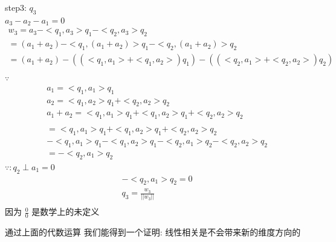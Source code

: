 \documentclass[12pt]{article}
\begin{document}
\begin{flushleft}
    step3: $q_{3}$ \\
    $ a_{3} - a_{2} - a_{1} = 0 $ \\
    \begin{align}
        w_{3} = a_{3} - <q_{1},a_{3}>q_{1} - <q_{2},a_{3}>q_{2}                                             \\
        = (a_{1} + a_{2})  - <q_{1}, (a_{1}+ a_{2})>q_{1} - <q_{2},(a_{1} + a_{2})>q_{2}                    \\
        = (a_{1} + a_{2}) - ((<q_{1},a_{1}> + <q_{1},a_{2}>)q_{1}) - ((<q_{2},a_{1}> + <q_{2},a_{2}>)q_{2}) \\
    \end{align}
    $\because$ \\
    \begin{align}
        a_{1} = <q_{1},a_{1}>q_{1}                                                           \\
        a_{2} = <q_{1},a_{2}>q_{1} + <q_{2},a_{2}>q_{2}                                      \\
        a_{1} + a_{2} =  <q_{1},a_{1}>q_{1} +  <q_{1},a_{2}>q_{1} + <q_{2},a_{2}>q_{2}       \\                                                                                                                                           \\
        = <q_{1},a_{1}>q_{1} +  <q_{1},a_{2}>q_{1} + <q_{2},a_{2}>q_{2}                      \\
        - <q_{1},a_{1}>q_{1} - <q_{1},a_{2}>q_{1}  - <q_{2},a_{1}>q_{2} - <q_{2},a_{2}>q_{2} \\
        = -<q_{2},a_{1}>q_{2}
    \end{align}
    $\because: q_{2} \perp a_{1} =  0$ \\
    \begin{align}
        -<q_{2},a_{1}>q_{2} = 0         \\
        q_{3} = \frac{w_{3}}{||w_{3}||} \\
    \end{align}
    因为 $\frac{0}{0}$ 是数学上的未定义

    通过上面的代数运算 我们能得到一个证明: 线性相关是不会带来新的维度方向的 \\


\end{flushleft}
\end{document}
